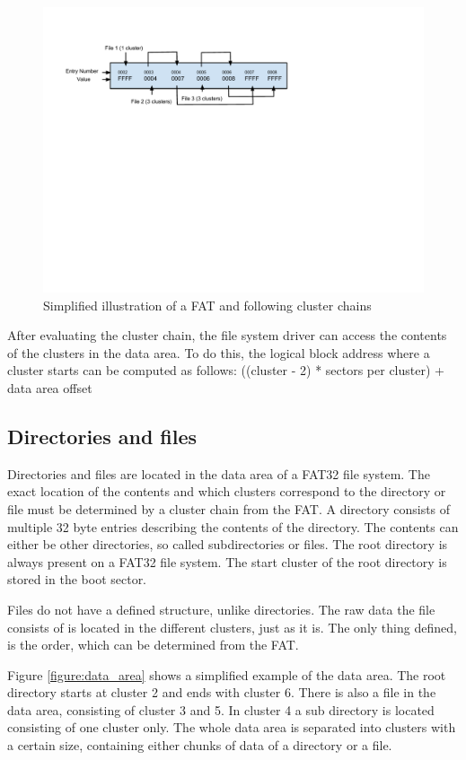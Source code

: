 \begin{figure}[h!]
\caption{Simplified illustration of a FAT and following cluster chains}
\centering
\includegraphics{figures/cluster_chain}
\end{figure}

After evaluating the cluster chain, the file system driver can access the contents of the clusters in the data area. To do this, the logical block address where a cluster starts can be computed as follows: ((cluster - 2) * sectors per cluster) + data area offset

\subsection{Directories and files}

Directories and files are located in the data area of a FAT32 file system. The exact location of the contents and which clusters correspond to the directory or file must be determined by a cluster chain from the FAT. A directory consists of multiple 32 byte entries describing the contents of the directory. The contents can either be other directories, so called subdirectories or files. The root directory is always present on a FAT32 file system. The start cluster of the root directory is stored in the boot sector.

Files do not have a defined structure, unlike directories. The raw data the file consists of is located in the different clusters, just as it is. The only thing defined, is the order, which can be determined from the FAT.

Figure \ref{figure:data_area} shows a simplified example of the data area. The root directory starts at cluster 2 and ends with cluster 6. There is also a file in the data area, consisting of cluster 3 and 5. In cluster 4 a sub directory is located consisting of one cluster only. The whole data area is separated into clusters with a certain size, containing either chunks of data of a directory or a file.

